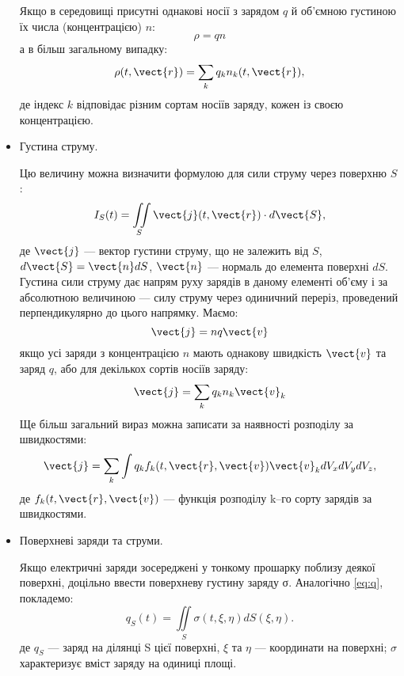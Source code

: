 \begin{itemize}
Якщо в середовищі присутні однакові носії з зарядом $q$ й об’ємною
густиною їх числа (концентрацією) $n$:
\begin{equation}
    \rho = qn
\end{equation}
а в більш загальному випадку:
\begin{equation}
    \rho(t, \vect{r}) = \sum\limits_k q_kn_k(t, \vect{r}),
\end{equation}
де індекс $k$ відповідає різним сортам носіїв заряду, кожен із своєю концентрацією.


\item Густина струму.


Цю величину можна визначити формулою для сили
струму через поверхню $S$:
\begin{equation}
    I_S(t) = \iint\limits_S \vect{j}(t, \vect{r})\cdot d\vect{S},
\end{equation}
де $\vect{j}$ --- вектор густини струму, що не залежить від $S$, $d\vect{S} = \vect{n} dS$, $\vect{n}$ --- нормаль до
елемента поверхні $dS$. Густина сили струму дає напрям руху зарядів в даному
елементі об’єму і за абсолютною величиною --- силу струму через одиничний
переріз, проведений перпендикулярно до цього напрямку. Маємо:
\begin{equation}
    \vect{j} = nq\vect{v}
\end{equation}
якщо усі заряди з концентрацією $n$ мають однакову швидкість $\vect{v}$ та заряд $q$,
або для декількох сортів носіїв заряду:
\begin{equation}
\vect{j} = \sum\limits_k q_k n_k\vect{v}_k
\end{equation}
Ще більш загальний вираз можна записати за наявності розподілу за
швидкостями:
\begin{equation}
\vect{j} = \sum\limits_k \int  q_k f_k(t, \vect{r}, \vect{v}) \vect{v}_k dV_xdV_ydV_z,
\end{equation}
де $f_k(t, \vect{r}, \vect{v})$ --- функція розподілу k–го сорту зарядів за швидкостями.


\item Поверхневі заряди та струми.


 Якщо електричні заряди зосереджені у
тонкому прошарку поблизу деякої поверхні, доцільно ввести поверхневу
густину заряду σ. Аналогічно \eqref{eq:q}, покладемо:
\begin{equation}
    q_S(t) = \iint\limits_S \sigma(t, \xi, \eta) dS(\xi, \eta).
\end{equation}
де $q_S$ --- заряд на ділянці S цієї поверхні, $\xi$ та $\eta$ --- координати на поверхні; $\sigma$
характеризує вміст заряду на одиниці площі.



\end{itemize}

